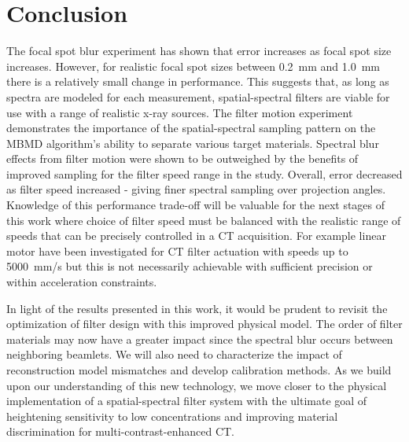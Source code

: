 \documentclass[]{spie}  %
\begin{document}
\section{Conclusion}

The focal spot blur experiment has shown that error increases as focal spot size increases. However, for realistic focal spot sizes between 0.2~mm and 1.0~mm there is a relatively small change in performance. This suggests that, as long as spectra are modeled for each measurement, spatial-spectral filters are viable for use with a range of realistic x-ray sources. The filter motion experiment demonstrates the importance of the spatial-spectral sampling pattern on the MBMD algorithm's ability to separate various target materials. Spectral blur effects from filter motion were shown to be outweighed by the benefits of improved sampling for the filter speed range in the study. Overall, error decreased as filter speed increased - giving finer spectral sampling over projection angles. Knowledge of this performance trade-off will be valuable for the next stages of this work where choice of filter speed must be balanced with the realistic range of speeds that can be precisely controlled in a CT acquisition. For example linear motor have been investigated for CT filter actuation with speeds up to 5000~mm/s but this is not necessarily achievable with sufficient precision or within acceleration constraints. 

In light of the results presented in this work, it would be prudent to revisit the optimization of filter design with this improved physical model. The order of filter materials may now have a greater impact since the spectral blur occurs between neighboring beamlets. We will also need to characterize the impact of reconstruction model mismatches and develop calibration methods. As we build upon our understanding of this new technology, we move closer to the physical implementation of a spatial-spectral filter system with the ultimate goal of heightening sensitivity to low concentrations and improving material discrimination for multi-contrast-enhanced CT.

\end{document}
